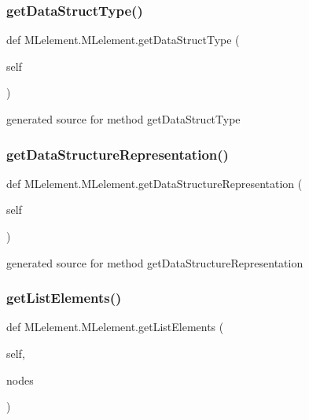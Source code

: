 \subsubsection{\texorpdfstring{get\+Data\+Struct\+Type()}{getDataStructType()}}
{\footnotesize\ttfamily def M\+Lelement.\+M\+Lelement.\+get\+Data\+Struct\+Type (\begin{DoxyParamCaption}\item[{}]{self }\end{DoxyParamCaption})}

\begin{DoxyVerb}generated source for method getDataStructType \end{DoxyVerb}
 \hypertarget{class_m_lelement_1_1_m_lelement_ad1856535489fc39dbaf8539f88ff6e45}{}\label{class_m_lelement_1_1_m_lelement_ad1856535489fc39dbaf8539f88ff6e45} 
\subsubsection{\texorpdfstring{get\+Data\+Structure\+Representation()}{getDataStructureRepresentation()}}
{\footnotesize\ttfamily def M\+Lelement.\+M\+Lelement.\+get\+Data\+Structure\+Representation (\begin{DoxyParamCaption}\item[{}]{self }\end{DoxyParamCaption})}

\begin{DoxyVerb}generated source for method getDataStructureRepresentation \end{DoxyVerb}
 \hypertarget{class_m_lelement_1_1_m_lelement_a71b7855b0790079c585465d013508d45}{}\label{class_m_lelement_1_1_m_lelement_a71b7855b0790079c585465d013508d45} 
\subsubsection{\texorpdfstring{get\+List\+Elements()}{getListElements()}}
{\footnotesize\ttfamily def M\+Lelement.\+M\+Lelement.\+get\+List\+Elements (\begin{DoxyParamCaption}\item[{}]{self,  }\item[{}]{nodes }\end{DoxyParamCaption})}

